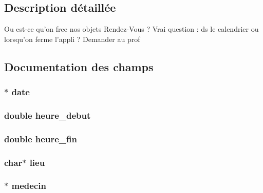 \subsection{Description détaillée}
Ou est-\/ce qu'on free nos objets Rendez-\/\-Vous ? Vrai question \-: ds le calendrier ou lorsqu'on ferme l'appli ? Demander au prof 

\subsection{Documentation des champs}
\hypertarget{struct_rendez_vous_a73fc78564c9badbcea68f2f2331c74db}{
\subsubsection[{date}]{$\ast$ date}}\label{struct_rendez_vous_a73fc78564c9badbcea68f2f2331c74db}
\hypertarget{struct_rendez_vous_a3877de0db2ba94f6179438f6ce2d79e4}{
\subsubsection[{heure\-\_\-debut}]{\setlength{\rightskip}{0pt plus 5cm}double heure\-\_\-debut}}\label{struct_rendez_vous_a3877de0db2ba94f6179438f6ce2d79e4}
\hypertarget{struct_rendez_vous_a91f724ef59fa01719e26c722ce70666f}{
\subsubsection[{heure\-\_\-fin}]{\setlength{\rightskip}{0pt plus 5cm}double heure\-\_\-fin}}\label{struct_rendez_vous_a91f724ef59fa01719e26c722ce70666f}
\hypertarget{struct_rendez_vous_a4e5bf777d1128fd5e62442afa61ea3c9}{
\subsubsection[{lieu}]{\setlength{\rightskip}{0pt plus 5cm}char$\ast$ lieu}}\label{struct_rendez_vous_a4e5bf777d1128fd5e62442afa61ea3c9}
\hypertarget{struct_rendez_vous_a59131973441fcf6250df021bcf96d17c}{
\subsubsection[{medecin}]{$\ast$ medecin}}\label{struct_rendez_vous_a59131973441fcf6250df021bcf96d17c}
